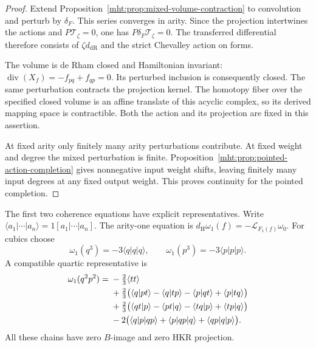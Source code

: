 \begin{proof}
Extend Proposition~\ref{mht:prop:mixed-volume-contraction}
to convolution and perturb by $\delta_F$. This series
converges in arity. Since the projection intertwines the
actions and $P\mathcal T_\zeta=0$, one has
$P\delta_F\mathcal T_\zeta=0$. The transferred differential
therefore consists of $\zeta d_{\mathrm{dR}}$ and the
strict Chevalley action on forms.

The volume is de Rham closed and Hamiltonian invariant:
$\operatorname{div}(X_f)=-f_{pq}+f_{qp}=0$.
Its perturbed inclusion is consequently closed. The same
perturbation contracts the projection kernel. The homotopy
fiber over the specified closed volume is an affine translate
of this acyclic complex, so its derived mapping space is
contractible. Both the action and its projection are fixed
in this assertion.

At fixed arity only finitely many arity perturbations
contribute. At fixed weight and degree the mixed perturbation
is finite. Proposition~\ref{mht:prop:pointed-action-completion}
gives nonnegative input weight shifts, leaving finitely many
input degrees at any fixed output weight. This proves
continuity for the pointed completion.
\end{proof}

The first two coherence equations have explicit representatives.
Write $\langle a_1|\cdots|a_n\rangle=1[a_1|\cdots|a_n]$.
The arity-one equation is
$d_{\mathrm H}\omega_1(f)=-\mathcal L_{F_1(f)}\omega_0$.
For cubics choose
\[
 \omega_1(q^3)=-3\langle q|q|q\rangle,
 \qquad \omega_1(p^3)=-3\langle p|p|p\rangle.
\]
A compatible quartic representative is
\begin{align}\label{mht:eq:quartic-volume-homotopy}
 \omega_1(q^2p^2)
 ={}&-\tfrac23\langle tt\rangle\\
 &+\tfrac23\bigl(
  \langle q|pt\rangle-\langle q|tp\rangle
 -\langle p|qt\rangle+\langle p|tq\rangle\bigr)\notag\\
 &+\tfrac23\bigl(
  \langle qt|p\rangle-\langle pt|q\rangle
 -\langle tq|p\rangle+\langle tp|q\rangle\bigr)\notag\\
 &-2\bigl(\langle q|p|qp\rangle
          +\langle p|qp|q\rangle
          +\langle qp|q|p\rangle\bigr).\notag
\end{align}
All these chains have zero $B$-image and zero HKR projection.

